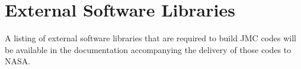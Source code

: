
\section{External Software Libraries}
\label{sec:app_lib}

A listing of external software libraries that are required to
build JMC codes will be available in the documentation
accompanying the delivery of those codes to NASA.





